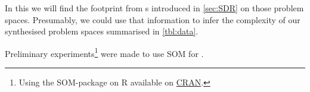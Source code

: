 \begin{comment}
\subsection{Probability of optimality}
\begin{figure}
	\subfloat[Probability a dispatch is optimal, stepwise (solid) and sequential (dashed).]{
		\texttt{[image: \{figures/j.rndn/trdat.prob.moveIsOptimal.6x5.OPT]}.pdf}
	}
	\\
	\subfloat[Probability of optimal dispatch being equivalent to SDRs]{
		\texttt{[image: \{figures/j.rndn/trdat.prob.moveIsOptimal.SDR.6x5]}.pdf}
	}
	\caption{Probability of dispatches begin optimal (above) and optimal dispatches begin equivalent to SDRs (below).}
\end{figure}

\subsection{Ranking}
\begin{figure}
	\subfloat[Ranking of dispathces]{
		\texttt{[image: \{figures/j.rndn/trdat.rank.6x5.OPT]}.pdf}
	}
	\\
	\subfloat[Ranking of dispatches chosen by SDRs]{
		\texttt{[image: \{figures/j.rndn/trdat.rankSDR.6x5]}.pdf}
	}
	\caption{Ranking as function of dispatch iteration, where lower ranking is preferred as rank 0 corresponds to optimal decision.}
\end{figure}
\end{comment}



In this  we will find the footprint 
from \sdr s introduced in \cref{sec:SDR} on those problem spaces. Presumably, 
we could use that information to infer the complexity of our synthesised 
problem spaces summarised in \cref{tbl:data}.

Preliminary experiments\footnote{Using the SOM-package on R available on 
  \href{https://cran.r-project.org/web/packages/som/index.html}{CRAN}.} were 
  made 
to use SOM for \JSP. 
